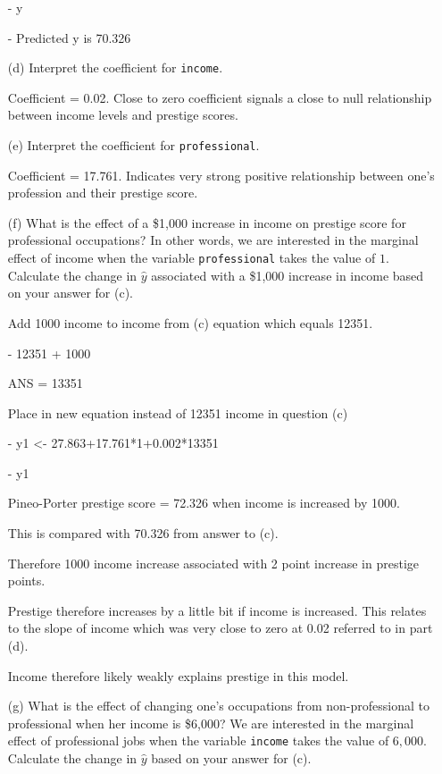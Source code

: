 \documentclass[12pt,letterpaper]{article}
\begin{document}
\begin{enumerate}
-	y 

-	Predicted y is 70.326
\newpage
	\item [(d)]
	Interpret the coefficient for \texttt{income}.

Coefficient = 0.02. Close to zero coefficient signals a close to null relationship between income levels and prestige scores.
	\vspace{10cm}	
	\item [(e)]
	Interpret the coefficient for \texttt{professional}.

Coefficient = 17.761. Indicates very strong positive relationship between one's profession and their prestige score. 
	
	\newpage
	\item [(f)]
	What is the effect of a \$1,000 increase in income on prestige score for professional occupations? In other words, we are interested in the marginal effect of income when the variable \texttt{professional} takes the value of $1$. Calculate the change in $\hat{y}$ associated with a \$1,000 increase in income based on your answer for (c).
	
Add 1000 income to income from (c) equation which equals 12351. 

- 12351 + 1000 

ANS = 13351

Place in new equation instead of 12351 income in  question (c)

- y1 <- 27.863+17.761*1+0.002*13351

- y1

Pineo-Porter prestige score = 72.326 when income is increased by 1000.

This is compared with 70.326 from answer to (c). 

Therefore 1000 income increase associated with 2 point increase in prestige points. 

Prestige therefore increases by a little bit if income is increased. This relates to the slope of income which was very close to zero at 0.02 referred to in part (d). 

Income therefore likely weakly explains prestige in this model.


	\vspace{10cm}
	
	
	\item [(g)]
	What is the effect of changing one's occupations from non-professional to professional when her income is \$6,000? We are interested in the marginal effect of professional jobs when the variable \texttt{income} takes the value of $6,000$. Calculate the change in $\hat{y}$ based on your answer for (c).
	

\end{enumerate}
\end{document}
